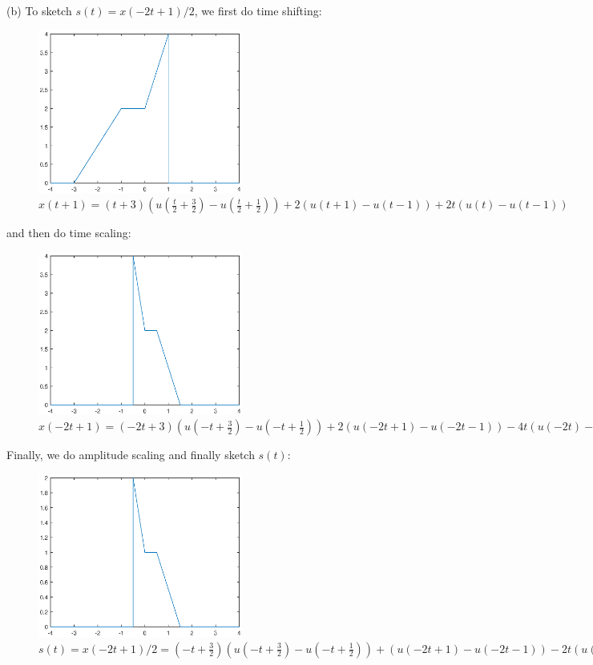 \documentclass[a4paper]{article}
\begin{document}
(b) To sketch $s(t)=x(-2t+1)/2$, we first do time shifting:
\begin{figure}[H]
  \begin{center}
    \includegraphics[width=0.6\textwidth]{4(b)_1.eps}
  \end{center}
  \caption{$x(t+1)=(t+3)(u(\frac{t}{2}+\frac{3}{2})-u(\frac{t}{2}+\frac{1}{2}))+2(u(t+1)-u(t-1))+2t(u(t)-u(t-1))$}
\end{figure}
and then do time scaling:
\begin{figure}[H]
  \begin{center}
    \includegraphics[width=0.6\textwidth]{4(b)_2.eps}
  \end{center}
  \caption{$x(-2t+1)=(-2t+3)(u(-t+\frac{3}{2})-u(-t+\frac{1}{2}))+2(u(-2t+1)-u(-2t-1))-4t(u(-2t)-u(-2t-1)).$}
\end{figure}
Finally, we do amplitude scaling and finally sketch $s(t)$:
\begin{figure}[H]
  \begin{center}
    \includegraphics[width=0.6\textwidth]{4(b)_3.eps}
  \end{center}
  \caption{$s(t)=x(-2t+1)/2=(-t+\frac{3}{2})(u(-t+\frac{3}{2})-u(-t+\frac{1}{2}))+(u(-2t+1)-u(-2t-1))-2t(u(-2t)-u(-2t-1)).$}
\end{figure}
\end{document}
